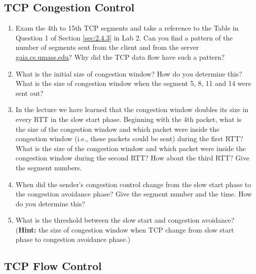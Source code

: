 \subsection{TCP Congestion Control} \label{sec:3.4.1}

\begin{enumerate}
\item Exam the 4th to 15th TCP segments and take a reference to
  the Table in Question 1 of Section \ref{sec:2.4.3} in Lab 2. Can you
  find a pattern of the number of segments sent from the client
  and from the server \url{gaia.cs.umass.edu}? Why did the
  TCP data flow have such a pattern?

\item What is the initial size of congestion window? How do you
  determine this? What is the size of congestion window when the
  segment 5, 8, 11 and 14 were sent out?

\item In the lecture we have learned that the congestion window
  doubles its size in every RTT in the slow start phase. Beginning
  with the 4th packet, what is the size of the congestion window and
  which packet were inside the congestion window (i.e., these packets
  could be sent) during the first RTT? What is the size of the
  congestion window and which packet were inside the congestion window
  during the second RTT? How about the third RTT? Give the segment
  numbers.

\item When did the sender's congestion control change from the slow
  start phase to the congestion avoidance phase? Give the segment
  number and the time. How do you determine this?


\item What is the threshold between the slow start and congestion
  avoidance? (\textbf{Hint:} the size of congestion window when TCP
  change from slow start phase to congestion avoidance phase.)
\end{enumerate}

\subsection{TCP Flow Control}\label{sec:3.4.2}

